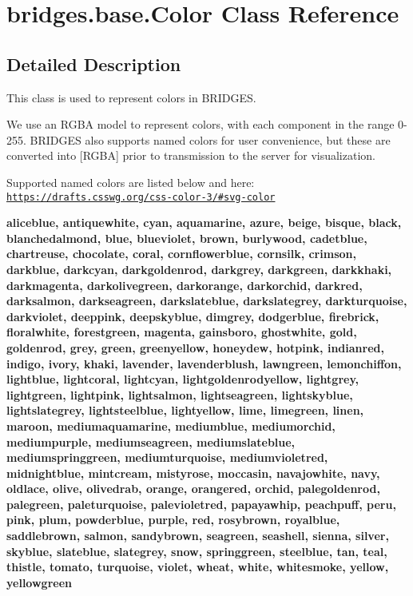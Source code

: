 \hypertarget{classbridges_1_1base_1_1_color}{}\section{bridges.\+base.\+Color Class Reference}
\label{classbridges_1_1base_1_1_color}


\subsection{Detailed Description}
This class is used to represent colors in B\+R\+I\+D\+G\+ES. 

We use an R\+G\+BA model to represent colors, with each component in the range 0-\/255. B\+R\+I\+D\+G\+ES also supports named colors for user convenience, but these are converted into \mbox{[}R\+G\+BA\mbox{]} prior to transmission to the server for visualization.

Supported named colors are listed below and here\+: \href{https://drafts.csswg.org/css-color-3/#svg-color}{\tt https\+://drafts.\+csswg.\+org/css-\/color-\/3/\#svg-\/color}

{\bfseries  aliceblue, antiquewhite, cyan, aquamarine, azure, beige, bisque, black, blanchedalmond, blue, blueviolet, brown, burlywood, cadetblue, chartreuse, chocolate, coral, cornflowerblue, cornsilk, crimson, darkblue, darkcyan, darkgoldenrod, darkgrey, darkgreen, darkkhaki, darkmagenta, darkolivegreen, darkorange, darkorchid, darkred, darksalmon, darkseagreen, darkslateblue, darkslategrey, darkturquoise, darkviolet, deeppink, deepskyblue, dimgrey, dodgerblue, firebrick, floralwhite, forestgreen, magenta, gainsboro, ghostwhite, gold, goldenrod, grey, green, greenyellow, honeydew, hotpink, indianred, indigo, ivory, khaki, lavender, lavenderblush, lawngreen, lemonchiffon, lightblue, lightcoral, lightcyan, lightgoldenrodyellow, lightgrey, lightgreen, lightpink, lightsalmon, lightseagreen, lightskyblue, lightslategrey, lightsteelblue, lightyellow, lime, limegreen, linen, maroon, mediumaquamarine, mediumblue, mediumorchid, mediumpurple, mediumseagreen, mediumslateblue, mediumspringgreen, mediumturquoise, mediumvioletred, midnightblue, mintcream, mistyrose, moccasin, navajowhite, navy, oldlace, olive, olivedrab, orange, orangered, orchid, palegoldenrod, palegreen, paleturquoise, palevioletred, papayawhip, peachpuff, peru, pink, plum, powderblue, purple, red, rosybrown, royalblue, saddlebrown, salmon, sandybrown, seagreen, seashell, sienna, silver, skyblue, slateblue, slategrey, snow, springgreen, steelblue, tan, teal, thistle, tomato, turquoise, violet, wheat, white, whitesmoke, yellow, yellowgreen }

